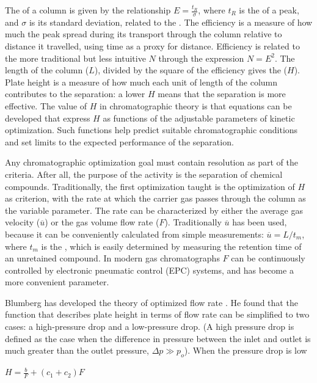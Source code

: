 The  of a column is given by the relationship \(E =
\frac{t_R}{\sigma} \), where \(t_R\) is the  of a peak,
and \(\sigma\) is its standard deviation, related to the 
\autocite{Blumberg2018}. The efficiency is a measure of how much the peak spread
during its transport through the column relative to distance it travelled, using
time as a proxy for distance. Efficiency is related to the more traditional but
less intuitive  \(N\) through the expression \(N =
E^2\). The length of the column (\(L\)), divided by the square of the efficiency
gives the  (\(H\)). Plate height is a measure of how much
each unit of length of the column contributes to the separation: a lower \(H\)
means that the separation is more effective. The value of \(H\) in chromatographic
theory is that equations can be developed that express \(H\) as functions of the
adjustable parameters of kinetic optimization. Such functions help predict
suitable chromatographic conditions and set limits to the expected performance
of the separation.

Any chromatographic optimization goal must contain resolution as part of the
criteria. After all, the purpose of the activity is the separation of chemical
compounds. Traditionally, the first optimization taught is the optimization of
\(H\) as criterion, with the rate at which the carrier gas passes through the
column as the variable parameter. The rate can be characterized by either the
average gas velocity (\(\overline{u}\)) or the gas volume flow rate (\(F\)).
Traditionally \(\overline{u}\) has been used, because it can be conveniently
calculated from simple measurements: \(\overline{u} = L/t_m\), where \(t_m\) is
the , which is easily determined by measuring the retention
time of an unretained compound. In modern gas chromatographs \(F\) can be
continuously controlled by electronic pneumatic control (EPC) systems, and has
become a more convenient parameter.

Blumberg has developed the theory of optimized flow rate
\autocite{Blumberg1999}. He found that the function that describes plate height
in terms of flow rate can be simplified to two cases: a high-pressure drop and a
low-pressure drop. (A high pressure drop is defined as the case when the
difference in pressure between the inlet and outlet is much greater than the
outlet pressure, \(\Delta{p} \gg p_o\)). When the pressure drop is low

\(H = \frac{\displaystyle b}{\displaystyle F}+(c_1+c_2)F \)

